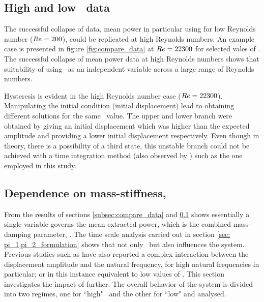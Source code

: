 \subsection{High and low \reynoldsnumber \ data}
\label{subsec:high_Re_data}



The successful collapse of data, mean power in particular using \massdamp for low Reynolds number ($Re=200$), could be replicated at high Reynolds numbers. An example case is presented in figure \ref{fig:compare_data} at $Re=22300$ for selected vales of \massstiff. The successful collapse of mean power data at high Reynolds numbers shows that suitability of using \massdamp \ as an independent variable across a large range of Reynolds numbers. 

Hysteresis is evident in the high Reynolds number case ($Re=22300$). Manipulating the initial condition (initial displacement) lead to obtaining different solutions for the same \massdamp \ value. The upper and lower branch were obtained by giving an initial displacement which was higher than the expected amplitude and providing a lower initial displacement respectively. Even though in theory, there is a possibility of a third state, this unstable branch could not be achieved with a time integration method (also observed by \citep{Vio2007}) such as the one employed in this study.

\subsection{Dependence on mass-stiffness, \massstiff}
\label{subsec:dependence pi_1}



From the results of sections \ref{subsec:compare_data} and \ref{subsec:high_Re_data} shows essentially a single variable governs the mean extracted power, which is the combined mass-damping parameter, \massdamp. The time scale analysis carried out in  section \ref{sec: pi_1,pi_2_formulation} shows that not only \massdamp \ but also \massstiff influences the system. Previous studies such as \cite{bouclin:77} have also reported a complex interaction between the displacement amplitude and the natural frequency, for high natural frequencies in particular; or in this instance equivalent to low values of \massstiff.  This section investigates the impact of \massstiff further. The overall behavior of the system is divided into two regimes, one for ``high" \massstiff \ and the other for ``low" \massstiff and analysed.

